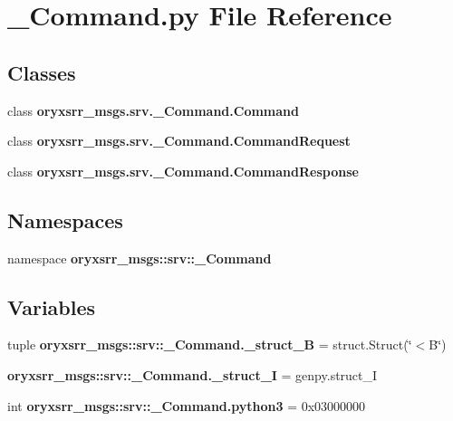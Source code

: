 \section{\-\_\-\-Command.\-py \-File \-Reference}
\label{__Command_8py}
\subsection*{\-Classes}
\begin{DoxyCompactItemize}
\item 
class {\bf oryxsrr\-\_\-msgs.\-srv.\-\_\-\-Command.\-Command}
\item 
class {\bf oryxsrr\-\_\-msgs.\-srv.\-\_\-\-Command.\-Command\-Request}
\item 
class {\bf oryxsrr\-\_\-msgs.\-srv.\-\_\-\-Command.\-Command\-Response}
\end{DoxyCompactItemize}
\subsection*{\-Namespaces}
\begin{DoxyCompactItemize}
\item 
namespace {\bf oryxsrr\-\_\-msgs\-::srv\-::\-\_\-\-Command}
\end{DoxyCompactItemize}
\subsection*{\-Variables}
\begin{DoxyCompactItemize}
\item 
tuple {\bf oryxsrr\-\_\-msgs\-::srv\-::\-\_\-\-Command.\-\_\-struct\-\_\-\-B} = struct.\-Struct(\char`\"{}$<$\-B\char`\"{})
\item 
{\bf oryxsrr\-\_\-msgs\-::srv\-::\-\_\-\-Command.\-\_\-struct\-\_\-\-I} = genpy.\-struct\-\_\-\-I
\item 
int {\bf oryxsrr\-\_\-msgs\-::srv\-::\-\_\-\-Command.\-python3} = 0x03000000
\end{DoxyCompactItemize}
